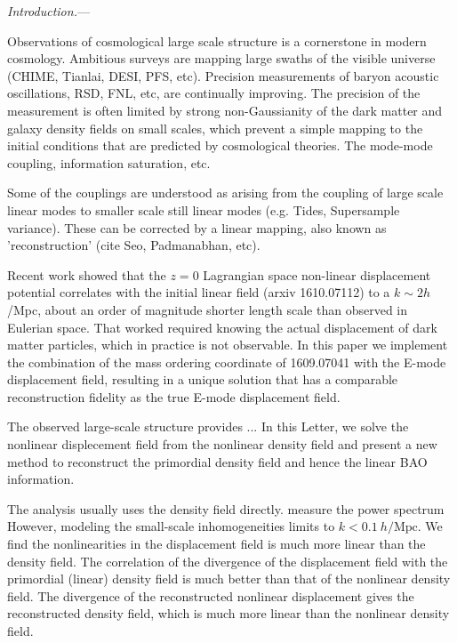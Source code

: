 \documentclass[aps,prd,twocolumn,showpacs,superscriptaddress,groupedaddress,nofootinbib]{revtex4}  %
\newcommand{\mr}{\mathrm}
\begin{document}
\pacs{}
\maketitle


{\it Introduction.}---

Observations of cosmological large scale structure is a cornerstone in
modern cosmology.  Ambitious surveys are mapping large swaths of the
visible universe (CHIME, Tianlai, DESI, PFS, etc).  Precision
measurements of baryon acoustic oscillations, RSD, FNL, etc, are
continually improving.  The precision of the measurement is often
limited by strong non-Gaussianity of the dark matter and galaxy
density fields on small scales, which prevent a simple mapping to the
initial conditions that are predicted by cosmological theories.  The
mode-mode coupling, information saturation, etc.

Some of the couplings are understood as arising from the coupling of
large scale linear modes to smaller scale still linear modes
(e.g. Tides, Supersample variance).  These can be corrected by a
linear mapping, also known as 'reconstruction' (cite Seo, Padmanabhan,
etc).

Recent work showed that the $z=0$ Lagrangian space non-linear
displacement potential correlates with the initial linear field (arxiv
1610.07112) to a $k\sim 2h$/Mpc, about an order of magnitude shorter
length scale than observed in Eulerian space.  That worked required
knowing the actual displacement of dark matter particles, which in
practice is not observable.  In this paper we implement the
combination of the mass ordering coordinate of 1609.07041 with the
E-mode displacement field, resulting in a unique solution that has a
comparable reconstruction fidelity as the true E-mode displacement field.

The observed large-scale structure provides ...
In this Letter, we solve the nonlinear displecement field from the nonlinear 
density field and present a new method to reconstruct the primordial density
field and hence the linear BAO information.

The analysis usually uses the density field directly. measure the power spectrum
However, modeling the small-scale inhomogeneities limits to $k<0.1\ h/\mr{Mpc}$.
We find the nonlinearities in the displacement field is much more linear than 
the density field. The correlation of the divergence of the displacement field
with the primordial (linear) density field is much better than that of the 
nonlinear density field. The divergence of the reconstructed nonlinear
displacement gives the reconstructed density field, which is much more linear
than the nonlinear density field.
\end{document}
